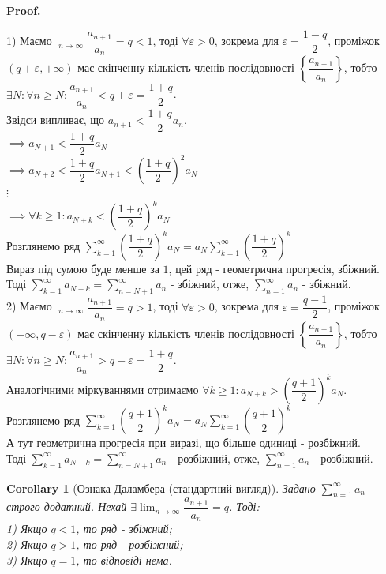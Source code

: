 \documentclass[a4paper, 10pt]{article}
\makeatletter
\DeclareMathOperator*\uplim{\overline{lim}}
\DeclareMathOperator*\downlim{\underline{lim}}
\def\huge{\displaystyle}
\def\qed{$\blacksquare$}
\theoremstyle{theoremdd}
\theoremstyle{theoremdd}
\theoremstyle{theoremdd}
\theoremstyle{theoremdd}
\theoremstyle{theoremdd}
\theoremstyle{theoremdd}
\theoremstyle{theoremdd}
\theoremstyle{theoremdd}
\theoremstyle{theoremdd}
\newtheorem{corollary}[theorem]{Corollary}
\renewenvironment{proof}[1][Proof.\\]{\par
\pushQED{\hfill \qed}%
\normalfont \topsep6\p@\@plus6\p@\relax
\trivlist
\item\relax
{\bfseries
#1\@addpunct{.}}\hspace\labelsep\ignorespaces
}{%
\popQED\endtrivlist\@endpefalse
}
\makeatother
\begin{document}
\begin{proof}
1) Маємо $\huge\uplim_{n \to \infty} \dfrac{a_{n+1}}{a_n} = q < 1$, тоді $\forall \varepsilon > 0$, зокрема для $\varepsilon = \dfrac{1-q}{2}$, проміжок $(q+\varepsilon,+\infty)$ має скінченну кількість членів послідовності $\left\{ \dfrac{a_{n+1}}{a_n} \right\}$, тобто $\exists N: \forall n \geq N: \dfrac{a_{n+1}}{a_n} < q+\varepsilon = \dfrac{1+q}{2}$.\\
Звідси випливає, що $a_{n+1} < \dfrac{1+q}{2}a_n$.\\
$\implies a_{N+1} < \dfrac{1+q}{2}a_N$\\
$\implies a_{N+2} < \dfrac{1+q}{2}a_{N+1} < \left( \dfrac{1+q}{2} \right)^2 a_N$\\
$\vdots$\\
$\implies \forall k \geq 1: a_{N+k} < \left( \dfrac{1+q}{2} \right)^k a_N$\\
Розглянемо ряд $\huge \sum_{k=1}^{\infty} \left( \dfrac{1+q}{2} \right)^k a_N = a_N \sum_{k=1}^{\infty} \left( \dfrac{1+q}{2} \right)^k$\\
Вираз під сумою буде менше за $1$, цей ряд - геометрична прогресія, збіжний.\\
Тоді $\huge \sum_{k=1}^{\infty} a_{N+k} = \sum_{n = N+1}^{\infty} a_{n}$ - збіжний, отже, $\huge \sum_{n = 1}^{\infty} a_n$ - збіжний.
\bigskip \\
2) Маємо $\huge\downlim_{n \to \infty} \dfrac{a_{n+1}}{a_n} = q > 1$, тоді $\forall \varepsilon > 0$, зокрема для $\varepsilon = \dfrac{q-1}{2}$, проміжок $(-\infty,q-\varepsilon)$ має скінченну кількість членів послідовності $\left\{ \dfrac{a_{n+1}}{a_n} \right\}$, тобто $\exists N: \forall n \geq N: \dfrac{a_{n+1}}{a_n} > q-\varepsilon = \dfrac{1+q}{2}$.\\
Аналогічними міркуваннями отримаємо $\forall k \geq 1: a_{N+k} > \left( \dfrac{q+1}{2} \right)^k a_N$.\\
Розглянемо ряд $\huge \sum_{k=1}^{\infty} \left( \dfrac{q+1}{2} \right)^k a_N = a_N \sum_{k=1}^{\infty} \left( \dfrac{q+1}{2} \right)^k$\\
А тут геометрична прогресія при виразі, що більше одиниці - розбіжний.\\
Тоді $\huge \sum_{k=1}^{\infty} a_{N+k} = \sum_{n = N+1}^{\infty} a_{n}$ - розбіжний, отже, $\huge \sum_{n = 1}^{\infty} a_n$ - розбіжний.
\end{proof}

\begin{corollary}[Ознака Даламбера (стандартний вигляд)]
Задано $\huge \sum_{n=1}^{\infty} a_n$ - строго додатний. Нехай $\exists \huge \lim_{n \to \infty} \dfrac{a_{n+1}}{a_n} = q$. Тоді:\\
1) Якщо $q<1$, то ряд - збіжний;\\
2) Якщо $q>1$, то ряд - розбіжний;\\
3) Якщо $q=1$, то відповіді нема.
\end{corollary}
\end{document}
